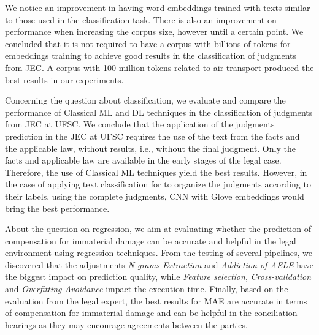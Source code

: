 We notice an improvement in having word embeddings trained with texts similar to those used in the classification task. There is also an improvement on performance when increasing the corpus size, however until a certain point.
We concluded that it is not required to have a corpus with billions of tokens for embeddings training to achieve good results in the classification of judgments from \gls{JEC}. A corpus with 100 million tokens related to air transport produced the best results in our experiments.

Concerning the question about classification, we evaluate and compare the performance of Classical \gls{ML} and \gls{DL} techniques in the classification of judgments from \gls{JEC} at \gls{UFSC}. 
We conclude that the application of the judgments prediction in the \gls{JEC} at \gls{UFSC} requires the use of the text from the facts and the applicable law, without results, i.e., without the final judgment. Only the facts and applicable law are available in the early stages of the legal case. Therefore, the use of Classical \gls{ML} techniques yield the best results. However, in the case of applying text classification for to organize the judgments according to their labels, using the complete judgments, \gls{CNN} with Glove embeddings would bring the best performance.

About the question on regression, we aim at evaluating whether the prediction of compensation for immaterial damage can be accurate and helpful in the legal environment using regression techniques. 
From the testing of several pipelines, we discovered that the adjustments \textit{N-grams Extraction} and \textit{Addiction of \gls{AELE}} have the biggest impact on prediction quality, while \textit{Feature selection}, \textit{Cross-validation} and \textit{Overfitting Avoidance} impact the execution time. 
Finally, based on the evaluation from the legal expert, the best results for MAE are accurate in terms of compensation for immaterial damage and can be helpful in the conciliation hearings as they may encourage agreements between the parties.


